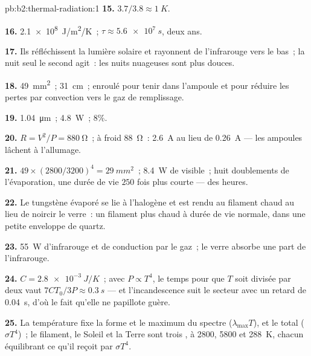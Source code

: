 \begin{solution}{pb:b2:thermal-radiation:1}
\textbf{15.} $3.7/3.8 \approx \qty{1}{K}$.

\textbf{16.} \qty{2.1e8}{J/m^2/K}~; $\tau \approx \qty{5.6e7}{s}$, deux ans.

\textbf{17.} Ils réfléchissent la lumière solaire et rayonnent de l'infrarouge vers le bas~; la nuit
seul le second agit~: les nuits nuageuses sont plus douces.

\textbf{18.} \qty{49}{mm^2}~; \qty{31}{cm}~; enroulé pour tenir dans l'ampoule et pour réduire
les pertes par convection vers le gaz de remplissage.

\textbf{19.} \qty{1.04}{\micro m}~; \qty{4.8}{W}~; $8\%$.

\textbf{20.} $R = V^2/P = \qty{880}{\ohm}$~; à froid \qty{88}{\ohm}~: \qty{2.6}{A}
au lieu de \qty{0.26}{A} --- les ampoules lâchent à l'allumage.

\textbf{21.} $49 \times (2800/3200)^4 = \qty{29}{mm^2}$~; \qty{8.4}{W} de visible~; huit
doublements de l'évaporation, une durée de vie $250$ fois plus courte --- des heures.

\textbf{22.} Le tungstène évaporé se lie à l'halogène et est rendu
au filament chaud au lieu de noircir le verre~: un filament plus chaud
à durée de vie normale, dans une petite enveloppe de quartz.

\textbf{23.} \qty{55}{W} d'infrarouge et de conduction par le gaz~; le
verre absorbe une part de l'infrarouge.

\textbf{24.} $C = \qty{2.8e-3}{J/K}$~; avec $P \propto T^4$, le temps pour que $T$ soit divisée par deux
vaut $7CT_0/3P \approx \qty{0.3}{s}$ --- et l'incandescence suit le secteur
avec un retard de \qty{0.04}{s}, d'où le fait qu'elle ne papillote guère.

\textbf{25.} La température fixe la forme et le maximum du spectre
($\lambda_{\max}T$), et le total ($\sigma T^4$)~; le filament, le Soleil et la Terre
sont trois , à \qty{2800}{}, \qty{5800}{} et \qty{288}{K}, chacun
équilibrant ce qu'il reçoit par $\sigma T^4$.
\end{solution}
